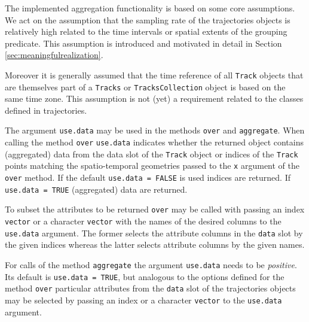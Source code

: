 \documentclass[12pt, oneside, a4paper]{scrbook}
\newcommand{\pkg}[1]{{\normalfont\fontseries{b}\selectfont #1}}
\let\code=\texttt
\begin{document}
The implemented aggregation functionality is based on some core assumptions. We act on the assumption that the sampling rate of the \pkg{trajectories} objects is relatively high related to the time intervals or spatial extents of the grouping predicate. This assumption is introduced and motivated in detail in Section \ref{sec:meaningfulrealization}.
\par\medskip
Moreover it is generally assumed that the time reference of all \code{Track} objects that are themselves part of a \code{Tracks} or \code{TracksCollection} object is based on the same time zone.
This assumption is not (yet) a requirement related to the classes defined in \pkg{trajectories}.
\par\medskip


The argument \code{use.data} may be used in the methods \code{over} and \code{aggregate}. When calling the method \code{over} \code{use.data} indicates whether the returned object contains (aggregated) data from the data slot of the \code{Track} object or indices of the \code{Track} points matching the spatio-temporal geometries passed to the \code{x} argument of the \code{over} method. If the default \code{use.data = FALSE} is used indices are returned. If \code{use.data = TRUE} (aggregated) data are returned. 
\par\medskip
To subset the attributes to be returned \code{over} may be called with passing an index \code{vector} or a character \code{vector} with the names of the desired columns to the \code{use.data} argument. The former selects the attribute columns in the \code{data} slot by the given indices whereas the latter selects attribute columns by the given names.
\par\medskip
For calls of the method \code{aggregate} the argument \code{use.data} needs to be \textit{positive}. Its default is \code{use.data = TRUE}, but analogous to the options defined for the method \code{over} particular attributes from the \code{data} slot of the \pkg{trajectories} objects may be selected by passing an index or a character \code{vector} to the \code{use.data} argument.
\par\medskip
\end{document}
